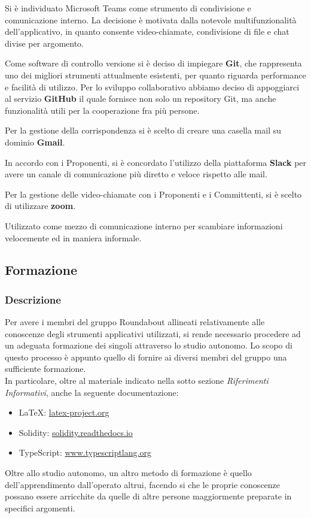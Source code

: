 				Si è individuato Microsoft Teams come strumento di condivisione e comunicazione interno. La decisione è motivata dalla notevole multifunzionalità dell'applicativo, in quanto consente video-chiamate, condivisione di file e chat divise per argomento.
				
				Come software di controllo versione si è deciso di impiegare \textbf{Git}, che rappresenta uno dei migliori strumenti attualmente esistenti, per quanto riguarda performance e facilità di utilizzo. Per lo sviluppo collaborativo abbiamo deciso di appoggiarci al servizio \textbf{GitHub} il quale fornisce non solo un repository Git, ma anche funzionalità utili per la cooperazione fra più persone.
							
				Per la gestione della corrispondenza si è scelto di creare una casella mail su dominio \textbf{Gmail}.
				
				In accordo con i Proponenti, si è concordato l'utilizzo della piattaforma \textbf{Slack} per avere un canale di comunicazione più diretto e veloce rispetto alle mail.
			
				Per la gestione delle video-chiamate con i Proponenti e i Committenti, si è scelto di utilizzare \textbf{zoom}.
				
				Utilizzato come mezzo di comunicazione interno per scambiare informazioni velocemente ed in maniera informale.
				

	\subsection{Formazione}
		
		\subsubsection{Descrizione}	
		Per avere i membri del gruppo Roundabout allineati relativamente alle conoscenze degli strumenti applicativi utilizzati, si rende necessario procedere ad un adeguata formazione dei singoli attraverso lo studio autonomo. Lo scopo di questo processo è appunto quello di fornire ai diversi membri del gruppo una sufficiente formazione.\\
		In particolare, oltre al materiale indicato nella sotto sezione \textit{Riferimenti Informativi}, anche la seguente documentazione:
		\begin{itemize}
			\item \LaTeX{}: \href{latex-project.org}{latex-project.org}
			\item Solidity: \href{solidity.readthedocs.io}{solidity.readthedocs.io}
			\item TypeScript: \href{www.typescriptlang.org}{www.typescriptlang.org}
		\end{itemize}
		Oltre allo studio autonomo, un altro metodo di formazione è quello dell'apprendimento dall'operato altrui, facendo si che le proprie conoscenze possano essere arricchite da quelle di altre persone maggiormente preparate in specifici argomenti.
